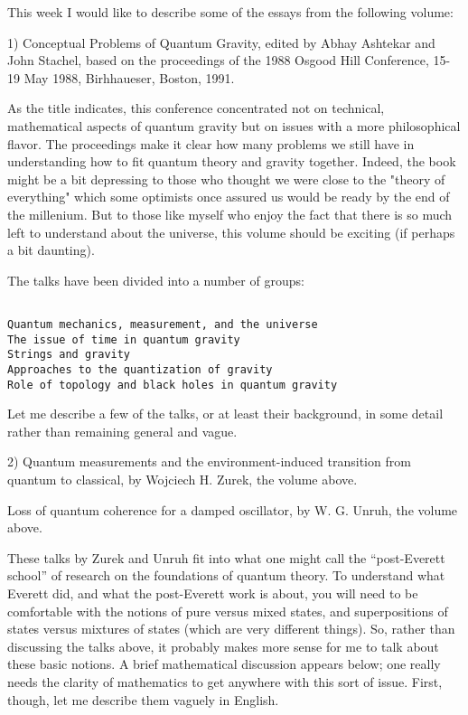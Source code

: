 

This week I would like to describe some of the essays from the
following volume:

1) Conceptual Problems of Quantum Gravity, edited by Abhay Ashtekar and
John Stachel, based on the proceedings of the 1988 Osgood Hill
Conference, 15-19 May 1988, Birhhaueser, Boston, 1991.

As the title indicates, this conference concentrated not on
technical, mathematical aspects of quantum gravity but on issues
with a more philosophical flavor.  The proceedings make it clear
how many problems we still have in understanding how to fit
quantum theory and gravity together.  Indeed, the book might be a
bit depressing to those who thought we were close to the "theory
of everything" which some optimists once assured us would be
ready by the end of the millenium.  But to those like myself who
enjoy the fact that there is so much left to understand about the
universe, this volume should be exciting (if perhaps a bit
daunting).

The talks have been divided into a number of groups:


\begin{verbatim}

Quantum mechanics, measurement, and the universe
The issue of time in quantum gravity
Strings and gravity
Approaches to the quantization of gravity
Role of topology and black holes in quantum gravity
\end{verbatim}
    

Let me describe a few of the talks, or at least their background, in
some detail rather than remaining general and vague.


2) Quantum measurements and the environment-induced transition from
quantum to classical, by Wojciech H. Zurek, the volume above.

Loss of quantum coherence for a damped oscillator, by W. G.
Unruh, the volume above.


These talks by Zurek and Unruh fit into what one might call the
``post-Everett school'' of research on the foundations of quantum
theory.  To understand what Everett did, and what the
post-Everett work is about, you will need to be comfortable with
the notions of pure versus mixed states, and superpositions of
states versus mixtures of states (which are very different
things).  So, rather than discussing the talks above, it probably
makes more sense for me to talk about these basic notions.   A
brief mathematical discussion  appears below; one really needs
the clarity of mathematics to get anywhere with this sort of
issue.  First, though, let me describe them vaguely in English.  


